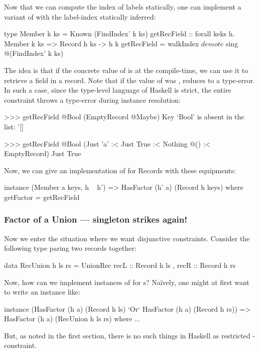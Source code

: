 \documentclass[demotion-paper.tex]{subfiles}
\begin{document}
Now that we can compute the index of labels statically, one can implement a variant of  with the label-index statically inferred:
\begin{code}
type Member k ks = Known (FindIndex' k ks)
getRecField :: forall keks h. Member k ks
  => Record h ks -> h k
getRecField = walkIndex $ 
  demote $ sing @(FindIndex' k ks)
\end{code}
The idea is that if the concrete value of  is  at the compile-time, we can use it to retrieve a field in a record.
Note that if the value of  was ,  reduces to a type-error.
In such a case, since the type-level language of Haskell is strict, the entire constraint  throws a type-error during instance resolution:
\begin{repl}
>>> getRecField @Bool (EmptyRecord @Maybe)
Key `Bool' is absent in the list: '[]

>>> getRecField @Bool (Just 'a' :< Just True
                :< Nothing @() :< EmptyRecord)
Just True
\end{repl}

Now, we can give an implementation of  for Records with these equipments:
\begin{code}
instance (Member a keys, h ~ h')
      => HasFactor (h' a) (Record h keys) where
  getFactor = getRecField
\end{code}

\subsubsection{Factor of a Union --- singleton strikes again!}
Now we enter the situation where we want disjunctive constraints.
Consider the following type paring two records together:
\begin{code}
data RecUnion h ls rs = 
  UnionRec { recL :: Record h ls
           , recR :: Record h rs }
\end{code}
Now, how can we implement instances of  for s?
Na\"{i}vely, one might at first want to write an instance like:
\begin{code}
instance (HasFactor (h a) (Record h ls)
          `Or` HasFactor (h a) (Record h rs))
  => HasFactor (h a) (RecUnion h ls rs) where ...
\end{code}
But, as noted in the first section, there is no such things in Haskell as restricted -constraint.
\end{document}
